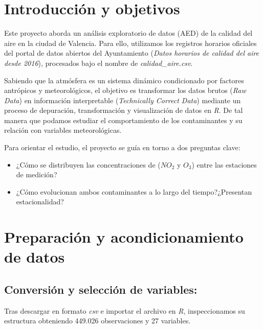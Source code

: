 \documentclass[notspecified,article,submit,oneauthor,pdftex]{Definitions/mdpi}
\begin{document}

\renewcommand{\contentsname}{Índice del proyecto}
\setcounter{tocdepth}{2}
\tableofcontents
\clearpage

\section{Introducción y objetivos}\label{introducciuxf3n-y-objetivos}

Este proyecto aborda un análisis exploratorio de datos (AED) de la
calidad del aire en la ciudad de Valencia. Para ello, utilizamos los
registros horarios oficiales del portal de datos abiertos del
Ayuntamiento (\emph{Datos horarios de calidad del aire desde 2016}),
procesados bajo el nombre de \emph{calidad\_aire.csv}.

Sabiendo que la atmósfera es un sistema dinámico condicionado por
factores antrópicos y meteorológicos, el objetivo es transformar los
datos brutos (\emph{Raw Data}) en información interpretable
(\emph{Technically Correct Data}) mediante un proceso de depuración,
transformación y visualización de datos en \emph{R}. De tal manera que
podamos estudiar el comportamiento de los contaminantes y su relación
con variables meteorológicas.

Para orientar el estudio, el proyecto se guía en torno a dos preguntas
clave:

\begin{itemize}
\item
  ¿Cómo se distribuyen las concentraciones de (\(NO_2\) y \(O_3\)) entre
  las estaciones de medición?
\item
  ¿Cómo evolucionan ambos contaminantes a lo largo del tiempo?¿Presentan
  estacionalidad?
\end{itemize}

\section{Preparación y acondicionamiento de
datos}\label{preparaciuxf3n-y-acondicionamiento-de-datos}

\subsection{Conversión y selección de
variables:}\label{conversiuxf3n-y-selecciuxf3n-de-variables}

Tras descargar en formato \emph{csv} e importar el archivo en \emph{R},
inspeccionamos su estructura obteniendo 449.026 observaciones y 27
variables.
\end{document}
